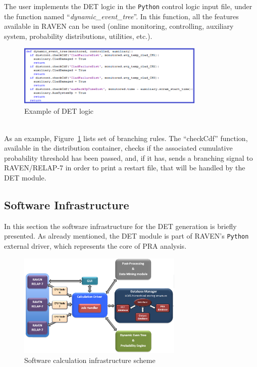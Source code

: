 The user implements the DET logic in the \verb!Python! control logic input file, under the function named ``\emph{dynamic\_event\_tree}''. In this function, all the features available in RAVEN can be used (online monitoring, controlling, auxiliary system, probability distributions, utilities, etc.).
\begin{figure}[h]
  \centering
     \includegraphics[width=0.8\textwidth]{figures/BranchingLaws.png}
  \caption{Example of DET logic}
   \label{fig:DET_branchLaws}
\end{figure}
\\As an example, Figure~\ref{fig:DET_branchLaws} lists set of branching rules. The ``checkCdf'' function, available in the distribution container, checks if the associated cumulative probability  threshold has been passed, and, if it has, sends a branching signal to RAVEN/RELAP-7 in order to print a restart file, that will be handled by the DET module.
\subsection{Software Infrastructure}
\label{sec:CPUInfrastructure}
In this section the software infrastructure for the DET generation is briefly presented. As already mentioned, the DET module is part of RAVEN's \verb!Python! external driver, which represents the core of PRA analysis.
\begin{figure}[h]
  \centering
     \includegraphics[width=0.70\textwidth]{figures/softwareCalcStructure.png}
  \caption{Software calculation infrastructure scheme}
   \label{fig:softwareInfrastructure}
\end{figure}

